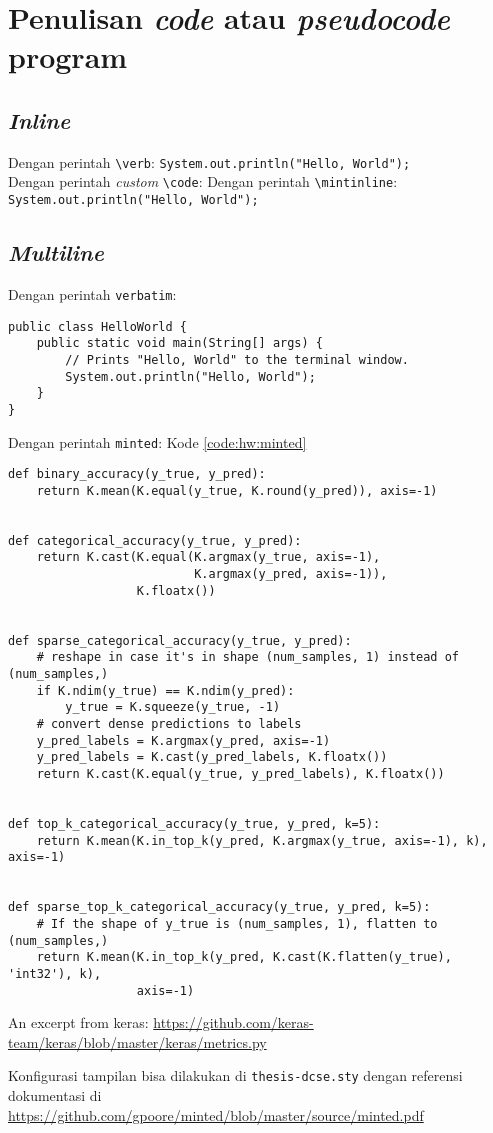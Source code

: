 \section{Penulisan \textit{code} atau \textit{pseudocode} program}

\subsection{\textit{Inline}}

Dengan perintah \verb|\verb|: \verb|System.out.println("Hello, World");| \\
Dengan perintah \textit{custom} \verb|\code|: 
Dengan perintah \verb|\mintinline|: \texttt{System.out.println("Hello, World"); }

\subsection{\textit{Multiline}}

Dengan perintah \verb|verbatim|: 

\begin{verbatim}	
public class HelloWorld {
    public static void main(String[] args) {
        // Prints "Hello, World" to the terminal window.
        System.out.println("Hello, World");
    }
}
\end{verbatim}

Dengan perintah \verb|minted|: Kode \ref{code:hw:minted}
\begin{listing}[H]
    \begin{verbatim}
def binary_accuracy(y_true, y_pred):
    return K.mean(K.equal(y_true, K.round(y_pred)), axis=-1)


def categorical_accuracy(y_true, y_pred):
    return K.cast(K.equal(K.argmax(y_true, axis=-1),
                          K.argmax(y_pred, axis=-1)),
                  K.floatx())


def sparse_categorical_accuracy(y_true, y_pred):
    # reshape in case it's in shape (num_samples, 1) instead of (num_samples,)
    if K.ndim(y_true) == K.ndim(y_pred):
        y_true = K.squeeze(y_true, -1)
    # convert dense predictions to labels
    y_pred_labels = K.argmax(y_pred, axis=-1)
    y_pred_labels = K.cast(y_pred_labels, K.floatx())
    return K.cast(K.equal(y_true, y_pred_labels), K.floatx())


def top_k_categorical_accuracy(y_true, y_pred, k=5):
    return K.mean(K.in_top_k(y_pred, K.argmax(y_true, axis=-1), k), axis=-1)


def sparse_top_k_categorical_accuracy(y_true, y_pred, k=5):
    # If the shape of y_true is (num_samples, 1), flatten to (num_samples,)
    return K.mean(K.in_top_k(y_pred, K.cast(K.flatten(y_true), 'int32'), k),
                  axis=-1)
    \end{verbatim}
    \caption{An excerpt from keras: \url{https://github.com/keras-team/keras/blob/master/keras/metrics.py}}
    \label{code:hw:minted}
\end{listing}

Konfigurasi tampilan bisa dilakukan di \verb|thesis-dcse.sty| dengan referensi dokumentasi di \url{https://github.com/gpoore/minted/blob/master/source/minted.pdf}